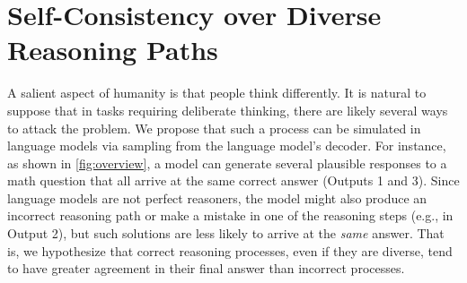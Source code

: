 \documentclass{article} %
\begin{document}



\section{Self-Consistency over Diverse Reasoning Paths}

A salient aspect of humanity is that people think differently.
It is natural to suppose that in tasks requiring deliberate thinking, there are likely 
several ways to attack the problem.
We propose that such a process can be simulated in language models via sampling from the language model's decoder. 
For instance, as shown in \cref{fig:overview}, a model can generate several plausible responses to a math question that all arrive at the same correct answer (Outputs 1 and 3).
Since language models are not perfect reasoners, the model might also produce an incorrect reasoning path or make a mistake in one of the reasoning steps (e.g., in Output 2), but such solutions are less likely to arrive at the \textit{same} answer.
That is, we hypothesize that correct reasoning processes, even if they are diverse, tend to have greater agreement in their final answer than incorrect processes.
\end{document}
